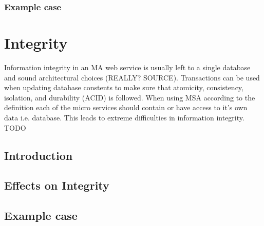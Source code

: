 \begin{sloppypar}
\begin{sloppypar}
\end{sloppypar}

\subsubsection{Example case}
\begin{sloppypar}
    
\end{sloppypar}




\section{Integrity}
\begin{sloppypar}
    Information integrity in an MA web service is usually left to a single database 
    and sound architectural choices (REALLY? SOURCE).
    Transactions can be used when updating database constents to make sure that
    atomicity, consistency, isolation, and durability (ACID) \citep{acid} is followed.
    When using MSA according to the definition each of the micro services should contain 
    or have access to it's own data i.e. database. This leads to extreme difficulties in information integrity.
    TODO
\end{sloppypar}

\subsection{Introduction}
\begin{sloppypar}

\end{sloppypar}

\subsection{Effects on Integrity}
\begin{sloppypar}

\end{sloppypar}

\subsection{Example case}
\begin{sloppypar}

\end{sloppypar}


\end{sloppypar}
